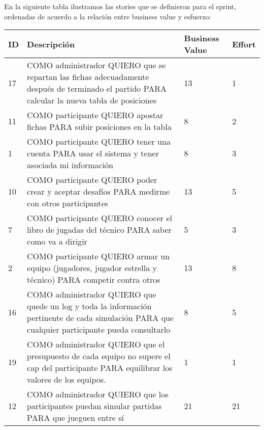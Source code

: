 \indent En la siguiente tabla ilustramos las stories que se definieron para el sprint, ordenadas de acuerdo a la relación entre business value y esfuerzo:\\

\begin{center}
  \begin{tabular}{| l | p{10cm} | l | l | }
    \hline
ID & Descripción & Business Value & Effort\\  \hline
17 & COMO administrador QUIERO que se repartan las fichas adecuadamente después de terminado el partido PARA calcular la nueva tabla de posiciones & 13 & 1\\  \hline
11 & COMO participante QUIERO apostar fichas PARA subir posiciones en la tabla & 8 & 2\\  \hline
1 & COMO participante QUIERO tener una cuenta PARA usar el sistema y tener asociada mi información & 8 & 3\\  \hline
10 & COMO participante QUIERO poder crear y aceptar desafíos PARA medirme con otros participantes & 13 & 5\\  \hline
7 & COMO participante QUIERO conocer el libro de jugadas del técnico PARA saber como va a dirigir & 5 & 3\\  \hline
2 & COMO participante QUIERO armar un equipo (jugadores, jugador estrella y técnico) PARA competir contra otros & 13 & 8\\  \hline
16 & COMO administrador QUIERO que quede un log y toda la información pertinente de cada simulación PARA que cualquier participante pueda consultarlo & 8 & 5\\  \hline
19 & COMO administrador QUIERO que el presupuesto de cada equipo no supere el cap del participante PARA equilibrar los valores de los equipos. & 1 & 1\\  \hline
12 & COMO administrador QUIERO que los participantes puedan simular partidas PARA que jueguen entre sí & 21 & 21\\  \hline
  \end{tabular}
\end{center}

